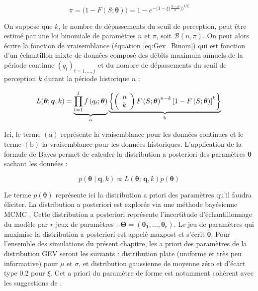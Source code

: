 		\begin{equation}
			\pi = \biggl( 1 - F(S;\boldsymbol{\theta})\biggl) = 1 - e^{-\biggl(1-\xi\bigl(\frac{S-\mu}{\sigma}\bigl)\biggl)^{1/\xi} }		
		\end{equation}
			 
	On suppose que $k$, le nombre de dépassements du seuil de perception, peut être estimé par une loi binomiale de paramètres $n$ et $\pi$, soit $\mathcal{B}(n,\pi)$. On peut alors écrire la fonction de vraisemblance (équation \ref{eq:Gev_Binom}) qui est fonction d'un échantillon mixte de données composé des débits maximum annuels de la période continue $(q_t)_{t=1,...,j}$ et du nombre de dépassements du seuil de perception $k$ durant la période historique $n$ :
		
			\begin{equation}
			L(\boldsymbol{\theta} ; \boldsymbol{q}, k) = \underbrace{\prod_{t=1}^j f\left(q_t;\boldsymbol{\theta}\right)}_{\mathrm{a}} \underbrace{\left\{\left(\begin{array}{l}
			n \\
			k
			\end{array}\right) F\left(S;\boldsymbol{\theta}\right)^{n-k}\left[1-F\left(S;\boldsymbol{\theta}\right)\right]^k\right\}}_{\mathrm{b}} \\
			\label{eq:Gev_Binom}
			\end{equation}
			
			Ici, le terme \textit{$\mathrm{(a)}$} représente la vraisemblance pour les données continues et le terme \textit{$\mathrm{(b)}$} la vraisemblance pour les données historiques. L'application de la formule de Bayes permet de calculer la distribution a posteriori des paramètres $\boldsymbol{\theta}$ sachant les données :
			
			\begin{equation}
				p(\boldsymbol{\theta} \mid \boldsymbol{q},k) \propto L(\boldsymbol{\theta};\,\boldsymbol{q},k) p(\boldsymbol{\theta})
				\label{eq:BayesBinom}
			\end{equation}
	
		Le terme $p(\boldsymbol{\theta})$ représente ici la distribution a priori des paramètres qu'il faudra éliciter. La distribution a posteriori est explorée via une méthode bayésienne MCMC \citep{renard_application_2006}. Cette distribution a posteriori représente l'incertitude d'échantillonnage du modèle par $r$ jeux de paramètres : $\boldsymbol{\Theta} = (\boldsymbol{\theta_1},...,\boldsymbol{\theta_r})$. Le jeu de paramètres qui maximise la distribution a posteriori est appelé maxpost et s'écrit $\boldsymbol{ \hat{\theta} }$. Pour l'ensemble des simulations du présent chapitre, les a priori des paramètres de la distribution GEV seront les suivants : distribution plate (uniforme et très peu informative) pour $\mu$ et $\sigma$, et distribution gaussienne de moyenne zéro et d'écart type 0.2 pour $\xi$. Cet a priori du paramètre de forme est notamment cohérent avec les suggestions de \citet{martins_generalized_2000}.
	
